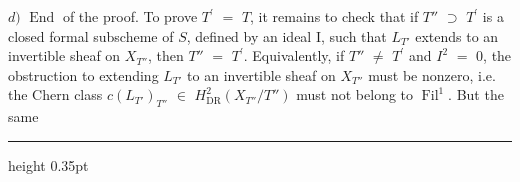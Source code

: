 \documentclass[9pt]{article}
\newcommand{\CanonText}[1]{\par{\fontsize{8.0}{9.35}\selectfont\RaggedRight #1\par}\vspace{2.2pt}}
\begin{document}
\begin{minipage}[t][\dimexpr\textheight-5pt\relax][t]{\textwidth}
\CanonText{\(d)\) \(\operatorname{End}\) of the proof. To prove \(T^{\prime}\) \(=\) \(T\), it remains to check that if \(T''\) \(\supset{}\) \(T^{\prime}\) is a closed formal subscheme of \(S\), defined by an ideal I, such that \(L_{T'}\) extends to an invertible sheaf on \(X_{T''}\), then \(T''\) \(=\) \(T^{\prime}\). Equivalently, if \(T''\) \(\neq{}\) \(T^{\prime}\) and \(I^{2}\) \(=\) 0, the obstruction to extending \(L_{T'}\) to an invertible sheaf on \(X_{T''}\) must be nonzero, i.e. the Chern class \(c(L_{T'})_{T''}\) \(\in{}\) \(H^{2}_{\mathrm{DR}}(X_{T''}/T'')\) must not belong to \(\operatorname{Fil}^{1}\). But the same}
\vfill
{\color{Accent}\hrule height 0.35pt}\vspace{3pt}
\end{minipage}
\newpage
\end{document}
